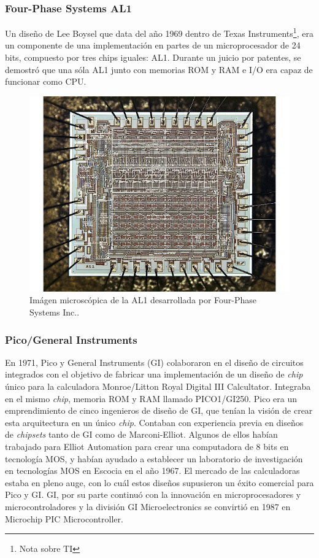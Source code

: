 \subsubsection{Four-Phase Systems AL1}
\label{subsubsec:theory-history-microprocessor-al1}

Un diseño de Lee Boysel que data del año 1969 dentro de Texas
Instruments\footnote{Nota sobre TI}, era un componente de una implementación en
partes de un microprocesador de 24 bits, compuesto por tres chips iguales: AL1.
Durante un juicio por patentes, se demostró que una sóla AL1 junto con memorias
ROM y RAM e I/O era capaz de funcionar como CPU.

\begin{figure}
  \centering
  \includegraphics[scale=0.5]{./figures/C02-al1}
  \captionsetup{justification=centering}
  \caption{Imágen microscópica de la AL1 desarrollada por Four-Phase Systems 
    Inc..}
  \label{fig:C02-al1}
\end{figure}


\subsubsection{Pico/General Instruments}
\label{subsubsec:theory-history-microprocessor-pico-gi}

En 1971, Pico y General Instruments (GI) colaboraron en el diseño de circuitos
integrados con el objetivo de fabricar una implementación de un diseño de
\emph{chip} único para la calculadora Monroe/Litton Royal Digital III
Calcultator. Integraba en el mismo \emph{chip}, memoria ROM y RAM llamado
PICO1/GI250. Pico era un emprendimiento de cinco ingenieros de diseño de GI, que
tenían la visión de crear esta arquitectura en un único \emph{chip}. Contaban
con experiencia previa en diseños de \emph{chipsets} tanto de GI como de
Marconi-Elliot. Algunos de ellos habían trabajado para Elliot Automation para
crear una computadora de 8 bits en tecnología MOS, y habían ayudado a establecer
un laboratorio de investigación en tecnologías MOS en Escocia en el año 1967. El
mercado de las calculadoras estaba en pleno auge, con lo cuál estos diseños
supusieron un éxito comercial para Pico y GI. GI, por su parte continuó con la
innovación en microprocesadores  y microcontroladores y la división GI
Microelectronics se convirtió en 1987 en Microchip PIC Microcontroller.

